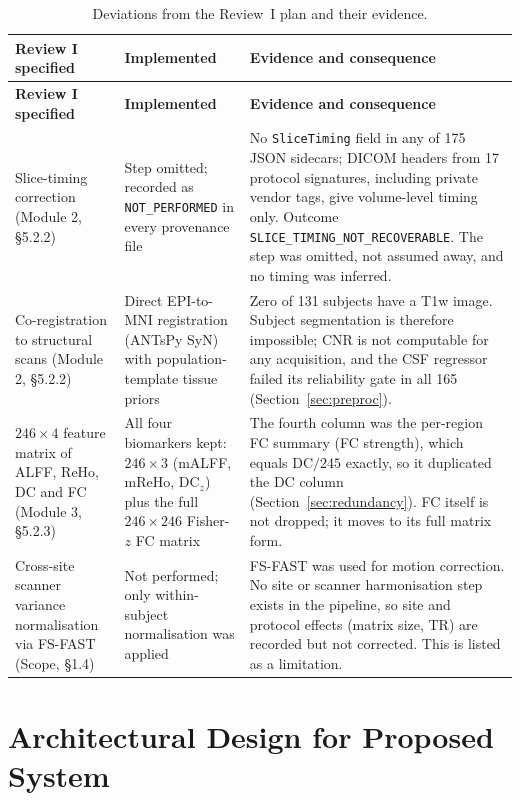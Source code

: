 \documentclass{ssnreview}
\begin{document}
{\small
\begin{longtable}{@{}>{\raggedright\arraybackslash}p{3.3cm}>{\raggedright\arraybackslash}p{3.1cm}>{\raggedright\arraybackslash}p{\dimexpr\textwidth-6.4cm-4\tabcolsep\relax}@{}}
\caption{Deviations from the Review~I plan and their evidence.}\label{tab:deviations}\\
\toprule
\textbf{Review I specified} & \textbf{Implemented} & \textbf{Evidence and consequence} \\
\midrule
\endfirsthead
\toprule
\textbf{Review I specified} & \textbf{Implemented} & \textbf{Evidence and consequence} \\
\midrule
\endhead
\bottomrule
\endfoot
\bottomrule
\endlastfoot
Slice-timing correction (Module 2, \S5.2.2) & Step omitted; recorded as
\texttt{NOT\_PERFORMED} in every provenance file &
No \texttt{SliceTiming} field in any of 175 JSON sidecars; DICOM headers from 17
protocol signatures, including private vendor tags, give volume-level timing only.
Outcome \texttt{SLICE\_TIMING\_NOT\_RECOVERABLE}. The step was omitted, not assumed
away, and no timing was inferred. \\
Co-registration to structural scans (Module 2, \S5.2.2) & Direct EPI-to-MNI registration
(ANTsPy SyN) with population-template tissue priors &
Zero of 131 subjects have a T1w image. Subject segmentation is therefore impossible;
CNR is not computable for any acquisition, and the CSF regressor failed its
reliability gate in all 165 (Section~\ref{sec:preproc}). \\
$246\times4$ feature matrix of ALFF, ReHo, DC and FC (Module 3, \S5.2.3) & All four
biomarkers kept: $246\times3$ (mALFF, mReHo, DC$_z$) plus the full $246\times246$
Fisher-$z$ FC matrix &
The fourth column was the per-region FC summary (FC strength), which equals DC$/245$
exactly, so it duplicated the DC column (Section~\ref{sec:redundancy}). FC itself is not
dropped; it moves to its full matrix form. \\
Cross-site scanner variance normalisation via FS-FAST (Scope, \S1.4) & Not
performed; only within-subject normalisation was applied &
FS-FAST was used for motion correction. No site or scanner harmonisation step exists in
the pipeline, so site and protocol effects (matrix size, TR) are recorded but not
corrected. This is listed as a limitation. \\
\end{longtable}}

\section{Architectural Design for Proposed System}
\end{document}
